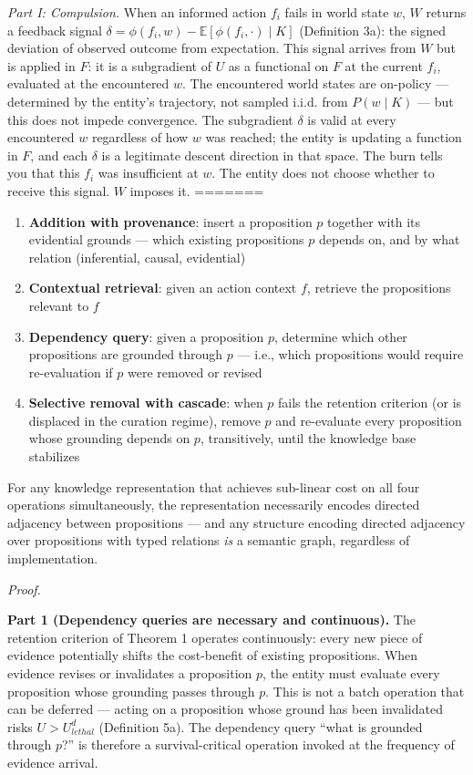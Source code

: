 \documentclass[
]{article}
\providecommand{\tightlist}{%
  \setlength{\itemsep}{0pt}\setlength{\parskip}{0pt}}
\begin{document}
\emph{Part I: Compulsion.} When an informed action \(f_i\) fails in
world state \(w\), \(W\) returns a feedback signal
\(\delta = \phi(f_i, w) - \mathbb{E}[\phi(f_i, \cdot) \mid K]\)
(Definition 3a): the signed deviation of observed outcome from
expectation. This signal arrives from \(W\) but is applied in \(F\): it
is a subgradient of \(U\) as a functional on \(F\) at the current
\(f_i\), evaluated at the encountered \(w\). The encountered world
states are on-policy --- determined by the entity's trajectory, not
sampled i.i.d. from \(P(w \mid K)\) --- but this does not impede
convergence. The subgradient \(\delta\) is valid at every encountered
\(w\) regardless of how \(w\) was reached; the entity is updating a
function in \(F\), and each \(\delta\) is a legitimate descent direction
in that space. The burn tells you that this \(f_i\) was insufficient at
\(w\). The entity does not choose whether to receive this signal. \(W\)
imposes it.
=======
\begin{enumerate}
\def\labelenumi{(\roman{enumi})}
\tightlist
\item
  \textbf{Addition with provenance}: insert a proposition \(p\) together
  with its evidential grounds --- which existing propositions \(p\)
  depends on, and by what relation (inferential, causal, evidential)
\item
  \textbf{Contextual retrieval}: given an action context \(f\), retrieve
  the propositions relevant to \(f\)
\item
  \textbf{Dependency query}: given a proposition \(p\), determine which
  other propositions are grounded through \(p\) --- i.e., which
  propositions would require re-evaluation if \(p\) were removed or
  revised
\item
  \textbf{Selective removal with cascade}: when \(p\) fails the
  retention criterion (or is displaced in the curation regime), remove
  \(p\) and re-evaluate every proposition whose grounding depends on
  \(p\), transitively, until the knowledge base stabilizes
\end{enumerate}

For any knowledge representation that achieves sub-linear cost on all
four operations simultaneously, the representation necessarily encodes
directed adjacency between propositions --- and any structure encoding
directed adjacency over propositions with typed relations \emph{is} a
semantic graph, regardless of implementation.

\emph{Proof.}

\textbf{Part 1 (Dependency queries are necessary and continuous).} The
retention criterion of Theorem 1 operates continuously: every new piece
of evidence potentially shifts the cost-benefit of existing
propositions. When evidence revises or invalidates a proposition \(p\),
the entity must evaluate every proposition whose grounding passes
through \(p\). This is not a batch operation that can be deferred ---
acting on a proposition whose ground has been invalidated risks
\(U > U_{lethal}^d\) (Definition 5a). The dependency query ``what is
grounded through \(p\)?'' is therefore a survival-critical operation
invoked at the frequency of evidence arrival.
\end{document}
